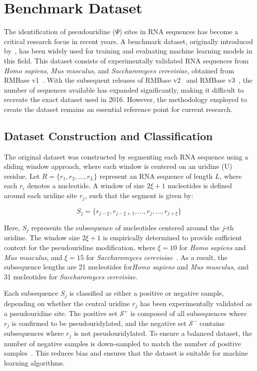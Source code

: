 \section{Benchmark Dataset}\label{sec:dataset}
  The identification of pseudouridine (\(\Psi\)) sites in RNA sequences has become a critical research focus in recent years.
  A benchmark dataset, originally introduced by~\cite{chen_irna-pseu_nodate}, has been widely used for training and evaluating machine learning models in this field.
  This dataset consists of experimentally validated RNA sequences from \textit{Homo sapiens}, \textit{Mus musculus}, and \textit{Saccharomyces cerevisiae}, obtained from RMBase v1~\cite{sun_rmbase_2016}.
  With the subsequent releases of RMBase v2~\cite{xuan_rmbase_2018} and RMBase v3~\cite{xuan_rmbase_2024}, the number of sequences available has expanded significantly, making it difficult to recreate the exact dataset used in 2016.
  However, the methodology employed to create the dataset remains an essential reference point for current research.

  \subsection{Dataset Construction and Classification}\label{subsec:dataset-construction}
    The original dataset was constructed by segmenting each RNA sequence using a sliding window approach, where each window is centered on an uridine (U) residue.
    Let \( R = \{r_1, r_2, \dots, r_L\} \) represent an RNA sequence of length \( L \), where each \( r_i \) denotes a nucleotide.
    A window of size \( 2\xi + 1 \) nucleotides is defined around each uridine site \( r_j \), such that the segment is given by:

    \[
      S_j = \{r_{j-\xi}, r_{j-\xi+1}, \dots, r_j, \dots, r_{j+\xi}\}
    \]

    Here, \( S_j \) represents the subsequence of nucleotides centered around the \( j \)-th uridine.
    The window size \( 2\xi + 1 \) is empirically determined to provide sufficient context for the pseudouridine modification, where \( \xi = 10 \) for \textit{Homo sapiens} and \textit{Mus musculus}, and \( \xi = 15 \) for \textit{Saccharomyces cerevisiae}~\cite{chen_irna-pseu_nodate}.
    As a result, the subsequence lengths are 21 nucleotides for\textit{Homo sapiens} and \textit{Mus musculus}, and 31 nucleotides for \textit{Saccharomyces cerevisiae}.

    Each subsequence \( S_j \) is classified as either a positive or negative sample, depending on whether the central uridine \( r_j \) has been experimentally validated as a pseudouridine site.
    The positive set \( \mathcal{S}^+ \) is composed of all subsequences where \( r_j \) is confirmed to be pseudouridylated, and the negative set \( \mathcal{S}^- \) contains subsequences where \( r_j \) is not pseudouridylated.
    To ensure a balanced dataset, the number of negative samples is down-sampled to match the number of positive samples~\cite{lee_downsampling_2022}.
    This reduces bias and ensures that the dataset is suitable for machine learning algorithms.


